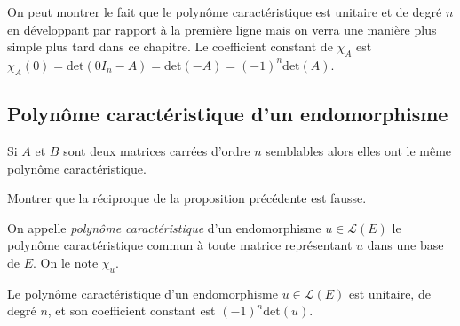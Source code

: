 \documentclass[a4paper,10pt]{report}
\begin{document}
\begin{preuve} On peut montrer le fait que le polynôme caractéristique est unitaire et de degré $n$ en développant par rapport à la première ligne mais on verra une manière plus simple plus tard dans ce chapitre. Le coefficient constant de $\chi_A$ est $\chi_A(0) = \textrm{det}(0 I_n-A) = \textrm{det}(-A) = (-1)^n \textrm{det}(A)$.
\end{preuve} 

\subsection{Polynôme caractéristique d'un endomorphisme}


\begin{prop} Si $A$ et $B$ sont deux matrices carrées d'ordre $n$ semblables alors elles ont le même polynôme caractéristique.
\end{prop}

\begin{preuve} 

\vspace{6cm}
\end{preuve}

\begin{exa} Montrer que la réciproque de la proposition précédente est fausse. 
\end{exa}

\begin{defin} On appelle \textit{polynôme caractéristique} d'un endomorphisme $u \in \mathcal{L}(E)$ le polynôme caractéristique commun à toute matrice représentant $u$ dans une base de $E$. On le note $\chi_u$.
\end{defin}

\begin{prop} Le polynôme caractéristique d'un endomorphisme $u \in \mathcal{L}(E)$ est unitaire, de degré $n$, et son coefficient constant est $(-1)^n \textrm{det}(u)$.
\end{prop}
\end{document}
